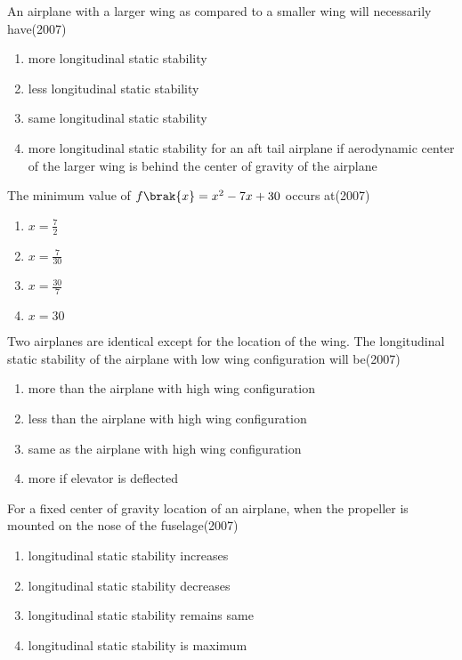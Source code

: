 \item An airplane with a larger wing as compared to a smaller wing will necessarily have\hfill(2007)
\begin{enumerate}
\item more longitudinal static stability
\item less longitudinal static stability
\item same longitudinal static stability
\item more longitudinal static stability for an aft tail airplane if aerodynamic center of the larger wing is behind the center of gravity of the airplane
\end{enumerate}


\item The minimum value of $f\brak{x}=x^{2}-7x+30$ occurs at\hfill(2007)
\begin{multicols}{2}
\begin{enumerate}
\item $x=\frac{7}{2}$
\item $x=\frac{7}{30}$
\item $x=\frac{30}{7}$
\item $x=30$
\end{enumerate}
\end{multicols}


\item Two airplanes are identical except for the location of the wing. The longitudinal static stability of the airplane with low wing configuration will be\hfill(2007)
\begin{enumerate}
\item more than the airplane with high wing configuration
\item less than the airplane with high wing configuration
\item same as the airplane with high wing configuration
\item more if elevator is deflected
\end{enumerate}

\item For a fixed center of gravity location of an airplane, when the propeller is mounted on the nose of the fuselage\hfill(2007)
\begin{enumerate}
\item longitudinal static stability increases
\item longitudinal static stability decreases
\item longitudinal static stability remains same
\item longitudinal static stability is maximum
\end{enumerate}


